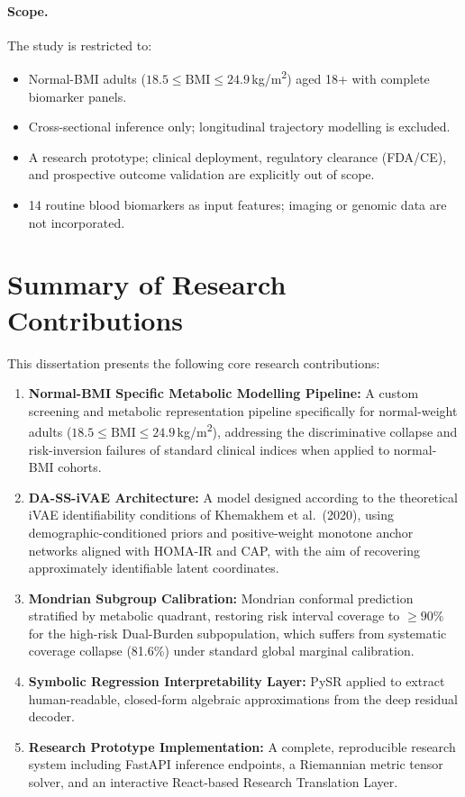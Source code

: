 \documentclass[12pt,a4paper,oneside]{report}
\newcommand{\daivae}{DA-SS-iVAE}
\begin{document}
\paragraph{Scope.} The study is restricted to:
\begin{itemize}[leftmargin=*]
    \item Normal-BMI adults ($18.5 \leq \text{BMI} \leq 24.9$\,kg/m\textsuperscript{2}) aged 18+ with complete biomarker panels.
    \item Cross-sectional inference only; longitudinal trajectory modelling is excluded.
    \item A research prototype; clinical deployment, regulatory clearance (FDA/CE), and prospective outcome validation are explicitly out of scope.
    \item 14 routine blood biomarkers as input features; imaging or genomic data are not incorporated.
\end{itemize}

\section{Summary of Research Contributions}

This dissertation presents the following core research contributions:

\begin{enumerate}[leftmargin=*]
    \item \textbf{Normal-BMI Specific Metabolic Modelling Pipeline:} A custom screening and metabolic representation pipeline specifically for normal-weight adults ($18.5 \leq \text{BMI} \leq 24.9$\,kg/m\textsuperscript{2}), addressing the discriminative collapse and risk-inversion failures of standard clinical indices when applied to normal-BMI cohorts.
    \item \textbf{\daivae{} Architecture:} A model designed according to the theoretical iVAE identifiability conditions of Khemakhem et al.\ (2020), using demographic-conditioned priors and positive-weight monotone anchor networks aligned with HOMA-IR and CAP, with the aim of recovering approximately identifiable latent coordinates.
    \item \textbf{Mondrian Subgroup Calibration:} Mondrian conformal prediction stratified by metabolic quadrant, restoring risk interval coverage to $\geq 90\%$ for the high-risk Dual-Burden subpopulation, which suffers from systematic coverage collapse (81.6\%) under standard global marginal calibration.
    \item \textbf{Symbolic Regression Interpretability Layer:} PySR applied to extract human-readable, closed-form algebraic approximations from the deep residual decoder.
    \item \textbf{Research Prototype Implementation:} A complete, reproducible research system including FastAPI inference endpoints, a Riemannian metric tensor solver, and an interactive React-based Research Translation Layer.
\end{enumerate}
\end{document}
